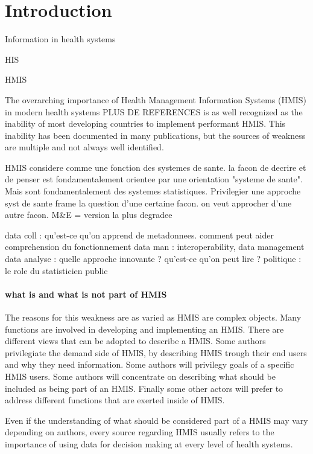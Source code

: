 \documentclass[a4paper,11pt,final,twoside]{article}
\begin{document}
\cleardoublepage
{} 
\setcounter{page}{1}

\section{Introduction}

Information in health systems

HIS 

HMIS 

The overarching importance of Health Management Information Systems (HMIS) in modern health systems\cite{foundph} PLUS DE REFERENCES is as well recognized as the inability of most developing countries to implement performant HMIS. This inability has been documented in many publications, but the sources of weakness are multiple and not always well identified.

HMIS considere comme une fonction des systemes de sante. la facon de decrire et de penser est fondamentalement orientee par une orientation "systeme de sante". Mais sont fondamentalement des systemes statistiques. Privilegier une approche syst de sante frame la question d'une certaine facon. on veut approcher d'une autre facon. M\&E = version la plus degradee

data coll : qu'est-ce qu'on apprend de metadonnees. comment peut aider comprehension du fonctionnement
data man : interoperability, data management
data analyse : quelle approche innovante ? qu'est-ce qu'on peut lire ?
politique : le role du statisticien public


\paragraph{what is and what is not part of HMIS} The reasons for this weakness are as varied as HMIS are complex objects. Many functions are involved in developing and implementing an HMIS. There are different views that can be adopted to describe a HMIS. Some authors privilegiate the demand side of HMIS, by describing HMIS trough their end users and why they need information. Some authors will privilegy goals of a specific HMIS users. Some authors will concentrate on describing what should be included as being part of an HMIS. Finally some other actors will prefer to address different functions that are exerted inside of HMIS. 

Even if the understanding of what should be considered part of a HMIS may vary depending on authors, every source regarding HMIS usually refers to the importance of using data for decision making at every level of health systems. 
\end{document}
